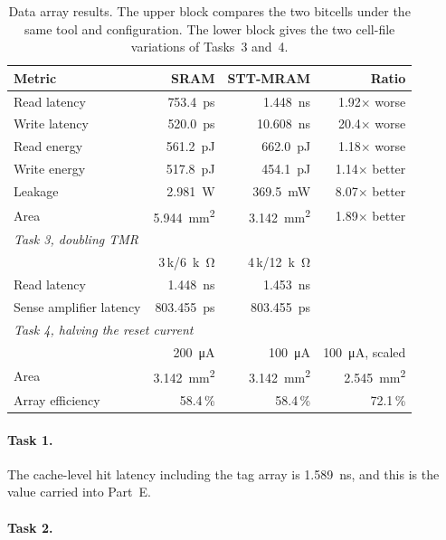 \documentclass[9pt,a4paper]{extarticle}
\begin{document}
\begin{table}[!ht]\centering\small
\caption{Data array results. The upper block compares the two bitcells
under the same tool and configuration. The lower block gives the two
cell-file variations of Tasks~3 and~4.}
\label{tab:c}
\begin{tabular}{|l|r|r|r|}
\hline
Metric & SRAM & STT-MRAM & Ratio \\
\hline
Read latency & \SI{753.4}{ps} & \SI{1.448}{ns} & 1.92$\times$ worse \\
\hline
Write latency & \SI{520.0}{ps} & \SI{10.608}{ns} & 20.4$\times$ worse \\
\hline
Read energy & \SI{561.2}{pJ} & \SI{662.0}{pJ} & 1.18$\times$ worse \\
\hline
Write energy & \SI{517.8}{pJ} & \SI{454.1}{pJ} & 1.14$\times$ better \\
\hline
Leakage & \SI{2.981}{W} & \SI{369.5}{mW} & 8.07$\times$ better \\
\hline
Area & \SI{5.944}{mm^2} & \SI{3.142}{mm^2} & 1.89$\times$ better \\
\hline
\multicolumn{4}{|l|}{\emph{Task 3, doubling TMR}} \\
\hline
& 3\,k/\SI{6}{k\ohm} & 4\,k/\SI{12}{k\ohm} & \\
\hline
Read latency & \SI{1.448}{ns} & \SI{1.453}{ns} & \\
\hline
Sense amplifier latency & \SI{803.455}{ps} & \SI{803.455}{ps} & \\
\hline
\multicolumn{4}{|l|}{\emph{Task 4, halving the reset current}} \\
\hline
& \SI{200}{\micro A} & \SI{100}{\micro A} & \SI{100}{\micro A}, scaled \\
\hline
Area & \SI{3.142}{mm^2} & \SI{3.142}{mm^2} & \SI{2.545}{mm^2} \\
\hline
Array efficiency & 58.4\,\% & 58.4\,\% & 72.1\,\% \\
\hline
\end{tabular}
\end{table}

\paragraph{Task 1.}

The cache-level hit latency including the tag array is \SI{1.589}{ns},
and this is the value carried into Part~E.

\paragraph{Task 2.}
\end{document}
